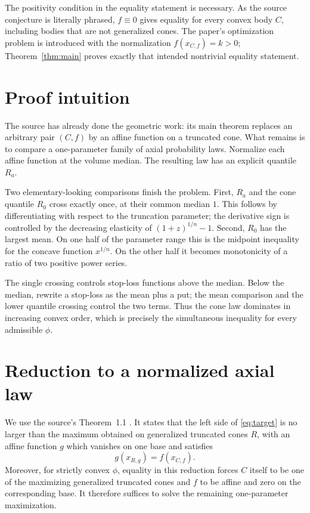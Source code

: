 \documentclass[11pt]{article}
\begin{document}
The positivity condition in the equality statement is necessary.  As the
source conjecture is literally phrased, $f\equiv0$ gives equality for every
convex body $C$, including bodies that are not generalized cones.  The
paper's optimization problem is introduced with the normalization
$f(x_{C,f})=k>0$; Theorem~\ref{thm:main} proves exactly that intended
nontrivial equality statement.

\section{Proof intuition}

The source has already done the geometric work: its main theorem replaces
an arbitrary pair $(C,f)$ by an affine function on a truncated cone.  What
remains is to compare a one-parameter family of axial probability laws.
Normalize each affine function at the volume median.  The resulting law has
an explicit quantile $R_a$.

Two elementary-looking comparisons finish the problem.  First, $R_a$ and
the cone quantile $R_0$ cross exactly once, at their common median $1$.
This follows by differentiating with respect to the truncation parameter;
the derivative sign is controlled by the decreasing elasticity of
$(1+z)^{1/n}-1$.  Second, $R_0$ has the largest mean.  On one half of the
parameter range this is the midpoint inequality for the concave function
$x^{1/n}$.  On the other half it becomes monotonicity of a ratio of two
positive power series.

The single crossing controls stop-loss functions above the median.  Below
the median, rewrite a stop-loss as the mean plus a put; the mean comparison
and the lower quantile crossing control the two terms.  Thus the cone law
dominates in increasing convex order, which is precisely the simultaneous
inequality for every admissible $\phi$.

\section{Reduction to a normalized axial law}

We use the source's Theorem~1.1 \cite[Theorem~1.1]{GM}.  It states that the left side of
\eqref{eq:target} is no larger than the maximum obtained on generalized
truncated cones $R$, with an affine function $g$ which vanishes on one
base and satisfies
\[
 g(x_{R,g})=f(x_{C,f}).
\]
Moreover, for strictly convex $\phi$, equality in this reduction forces
$C$ itself to be one of the maximizing generalized truncated cones and
$f$ to be affine and zero on the corresponding base.  It therefore
suffices to solve the remaining one-parameter maximization.
\end{document}
